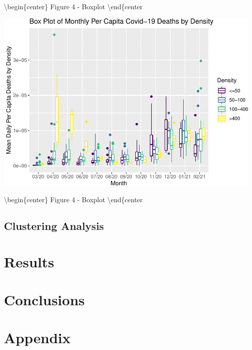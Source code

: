 \documentclass[11pt,]{article}
\begin{document}
\textbackslash begin\{center\} Figure 4 - Boxplot
\textbackslash end\{center

\includegraphics{figs/unnamed-chunk-10.pdf}

\textbackslash begin\{center\} Figure 4 - Boxplot
\textbackslash end\{center

\hypertarget{clustering-analysis}{%
\subsection{Clustering Analysis}\label{clustering-analysis}}

\hypertarget{results}{%
\section{Results}\label{results}}

\hypertarget{conclusions}{%
\section{Conclusions}\label{conclusions}}

\hypertarget{appendix}{%
\section{Appendix}\label{appendix}}





\newpage
\singlespacing 

\end{document}
